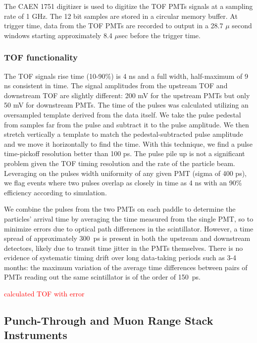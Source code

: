 The CAEN 1751 digitizer is used to digitize the TOF PMTs signals at a sampling rate of 1 GHz. The 12 bit samples are stored in a circular memory buffer. At trigger time, data from the TOF PMTs are recorded to output in a 28.7 $\mu$ second windows starting  approximately 8.4 $\mu$sec before the trigger time. 



\subsubsection{TOF functionality}\label{sec:MWPCfunc}


The TOF signals rise time (10-90\%) is 4 ns and a full width, half-maximum of 9 ns consistent in time. The signal amplitudes from the upstream TOF and  downstream TOF are slightly different:  200 mV for the upstream PMTs but only 50 mV for downstream PMTs. The time of the pulses was calculated utilizing an oversampled template derived from the data itself. We take the pulse pedestal from samples far from the pulse and subtract it to the pulse amplitude. We then stretch vertically a template to match the pedestal-subtracted pulse amplitude and we move it horizontally to find the time. With this technique, we find a pulse time-pickoff resolution better than 100 ps.  The pulse pile up is not a significant problem given the TOF timing resolution and the rate of the particle beam.  Leveraging on the pulses width uniformity of any given PMT (sigma of 400 ps),  we flag events where two pulses overlap as closely in time as 4 ns with an 90\% efficiency according to simulation. 


We combine the pulses from the two PMTs on each paddle to determine the particles' arrival time by averaging the time measured from the single PMT, so to minimize errors due to optical path differences in the scintillator.  However, a time spread of approximately 300~ps is present in both the upstream and downstream detectors, likely due to transit time jitter in the PMTs themselves.  There is no evidence of systematic timing drift over long data-taking periods such as 3-4 months: the maximum variation of the average time differences between pairs of PMTs reading out the same scintillator is of the order of 150~ps.

\textcolor{red}{calculated TOF with error}


\subsection{Punch-Through and Muon Range Stack Instruments}\label{sec:MuRS}

